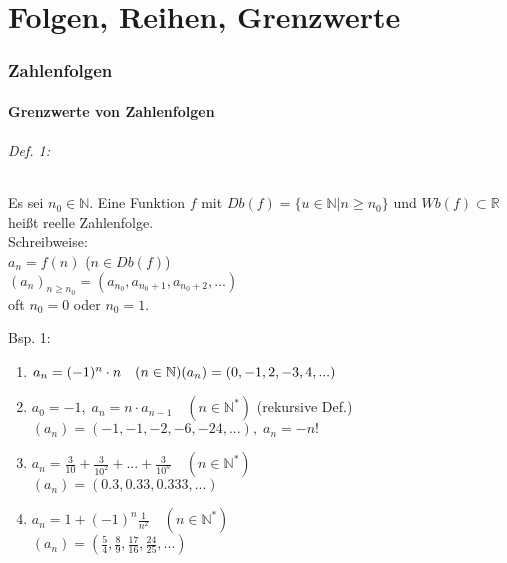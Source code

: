 \part{Folgen, Reihen, Grenzwerte}
\setcounter{section}{0}
\renewcommand*{\theHsection}{chX.\the\value{section}}
\section{Zahlenfolgen}
\subsection{Grenzwerte von Zahlenfolgen}
\paragraph{Def. 1:} \parskp
Es sei $n_0 \in \mathbb{N}$. Eine Funktion $f$ mit $Db(f)=\{u\in \mathbb{N}|n\geq n_0\}$ und $Wb(f) \subset \mathbb{R}$ heißt reelle Zahlenfolge.\\
Schreibweise: \\
$a_n=f(n)$ \qquad ($n \in Db(f)$)\\
$\left(a_n\right)_{n\geq n_0}=\left(a_{n_0}, a_{n_0+1}, a_{n_0+2}, ...\right)$\\
oft $n_0=0$ oder $n_0=1$.
\subparagraph{Bsp. 1:} 
\begin{enumerate}[label=\alph*.)]
\item $a_n=(-1)^n\cdot n \quad (n \in \mathbb{N})\\
(a_n)=(0,-1,2,-3,4,...)$
\item $a_0=-1,\; a_n=n\cdot a_{n-1} \quad (n \in \mathbb{N}^*)$ \quad (rekursive Def.)\\
$(a_n)=(-1,-1,-2,-6,-24,...), \; a_n = -n!$
\item $a_n=\frac{3}{10}+\frac{3}{10^2}+...+\frac{3}{10^n} \quad (n\in \mathbb{N}^*)$\\
$(a_n)=(0.3, 0.33, 0.333, ... )$
\item $a_n=1+(-1)^n\frac{1}{n^2} \quad (n \in \mathbb{N}^*)$\\
$(a_n)=\left( \frac{5}{4}, \frac{8}{9}, \frac{17}{16}, \frac{24}{25},...\right)$
\end{enumerate}

